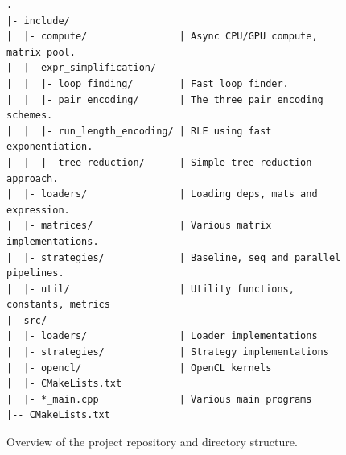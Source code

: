 \begin{figure}
\begin{lstlisting}[frame=none,numbers=none]
.
|- include/
|  |- compute/                | Async CPU/GPU compute, matrix pool.
|  |- expr_simplification/
|  |  |- loop_finding/        | Fast loop finder.
|  |  |- pair_encoding/       | The three pair encoding schemes.
|  |  |- run_length_encoding/ | RLE using fast exponentiation.
|  |  |- tree_reduction/      | Simple tree reduction approach.
|  |- loaders/                | Loading deps, mats and expression.
|  |- matrices/               | Various matrix implementations.
|  |- strategies/             | Baseline, seq and parallel pipelines.
|  |- util/                   | Utility functions, constants, metrics
|- src/
|  |- loaders/                | Loader implementations
|  |- strategies/             | Strategy implementations
|  |- opencl/                 | OpenCL kernels
|  |- CMakeLists.txt
|  |- *_main.cpp              | Various main programs
|-- CMakeLists.txt
\end{lstlisting}
\caption{Overview of the project repository and directory structure.}
\label{fig:overview}
\end{figure}
